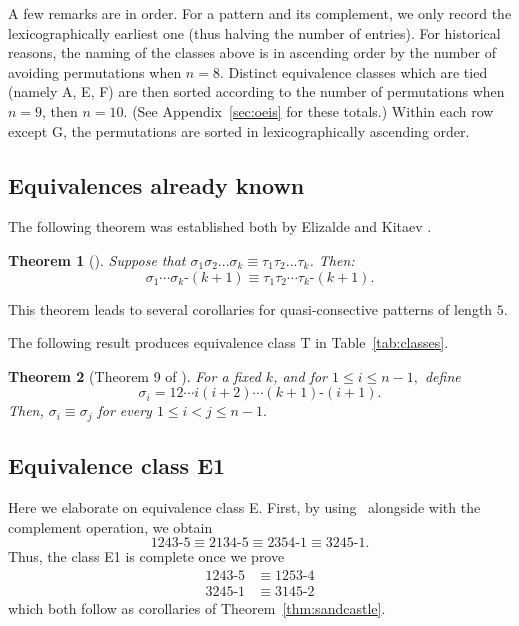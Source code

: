 \documentclass[11pt]{amsart}
\newtheorem{theorem}{Theorem}[section]
\theoremstyle{definition}
\begin{document}
A few remarks are in order.
For a pattern and its complement,
we only record the lexicographically earliest one
(thus halving the number of entries).
For historical reasons, the naming of the classes above
is in ascending order by the number of avoiding permutations when $n=8$.
Distinct equivalence classes which are tied (namely A, E, F)
are then sorted according to the number of permutations when $n=9$, then $n=10$.
(See Appendix~\ref{sec:oeis} for these totals.)
Within each row except G, the permutations are sorted in lexicographically ascending order.

\subsection{Equivalences already known}
The following theorem was established both by
Elizalde \cite{Elizalde2006} and Kitaev \cite{Kitaev2005}.
\begin{theorem}
	[\cite{Elizalde2006,Kitaev2005}]
	\label{thm:EK}
	Suppose that $\sigma_1\sigma_2...\sigma_k \equiv \tau_1\tau_2...\tau_k$.
	Then: \[ \sigma_1\cdots\sigma_k {\text{-}} (k+1) \equiv \tau_1\tau_2\cdots\tau_k {\text{-}} (k+1). \]
\end{theorem}
This theorem leads to several corollaries for
quasi-consective patterns of length $5$.

The following result produces
equivalence class T in Table~\ref{tab:classes}.
\begin{theorem}
	[Theorem 9 of \cite{BaxterShattuckMainPaper}]
	For a fixed $k$, and for $1 \le i \le n-1,$
	define \[ \sigma_i = 12\cdots i(i+2)\cdots(k+1){\text{-}}(i+1). \]
	Then, $\sigma_i \equiv \sigma_j$ for every $1 \le i < j \le n-1.$
\end{theorem}

\subsection{Equivalence class E1}
\label{sec:E1}
Here we elaborate on equivalence class E.
First, by using {\cite{Elizalde2006,Kitaev2005}}\ alongside with the complement operation, we obtain
\[ 1243{\text{-}}5 \equiv 2134{\text{-}}5 \equiv 2354{\text{-}}1 \equiv 3245{\text{-}}1. \]
Thus, the class E1 is complete once we prove
\begin{align*}
	1243{\text{-}}5 & \equiv 1253{\text{-}}4 \tag{E1a} \\
	3245{\text{-}}1 &\equiv 3145{\text{-}}2 \tag{E1b}
\end{align*}
which both follow as corollaries of Theorem~\ref{thm:sandcastle}.
\end{document}
